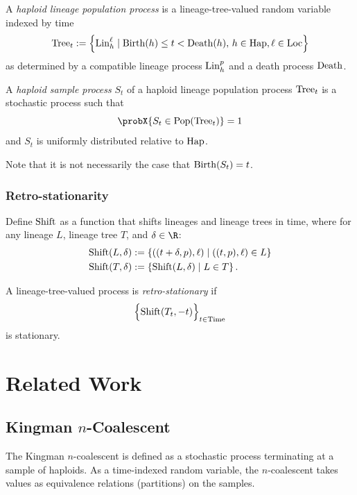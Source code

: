\begin{defin}
A \emph{haploid lineage population process} is a lineage-tree-valued random variable indexed by
  time
\[
  \mathrm{Tree}_t := \left\{
    \mathrm{Lin}_h^\ell \mid \mathrm{Birth}(h) \le t < \mathrm{Death}(h), \, h \in \mathrm{Hap}, \ell \in \mathrm{Loc}
  \right\}
\]
as determined by a compatible lineage process $\mathrm{Lin}^p_h$
  and a death process $\mathrm{Death}$.
\end{defin}

\begin{defin}
A \emph{haploid sample process} $S_t$ of a haploid lineage population process $\mathrm{Tree}_t$
is a stochastic process such that
\[
  \probX{ S_t \in \Pop(\Tree_t) } = 1
\]
and $S_t$ is uniformly distributed relative to $\mathrm{Hap}$.
\end{defin}

Note that it is not necessarily the case that $\mathrm{Birth}(S_t) = t$.


\subsubsection{Retro-stationarity}

\begin{defin}
Define $\mathrm{Shift}$ as a function that shifts lineages and lineage trees in time, where
for any lineage $L$, lineage tree $T$, and $\delta \in \R$:
\begin{align*}
  \mathrm{Shift}(L, \delta) &:= \{ ((t+\delta,p),\ell) \mid ((t,p),\ell) \in L \}  \\
  \mathrm{Shift}(T, \delta) &:= \left\{ \mathrm{Shift}(L, \delta) \mid L \in T \right\}
  \text{.}
\end{align*}
\end{defin}

\begin{defin}
A lineage-tree-valued process is \emph{retro-stationary} if
\[
  \Big\{ \mathrm{Shift}(T_t, -t) \Big\}_{t \in \mathrm{Time}}
\]
is stationary.
\end{defin}


\section{Related Work}
\label{sec:related-work}

\subsection{Kingman $n$-Coalescent}

The Kingman $n$-coalescent \cite{kingman_coalescent_1982} is defined
as a stochastic process terminating at a sample of haploids.
As a time-indexed random variable, the $n$-coalescent takes values
as equivalence relations (partitions) on the samples.

